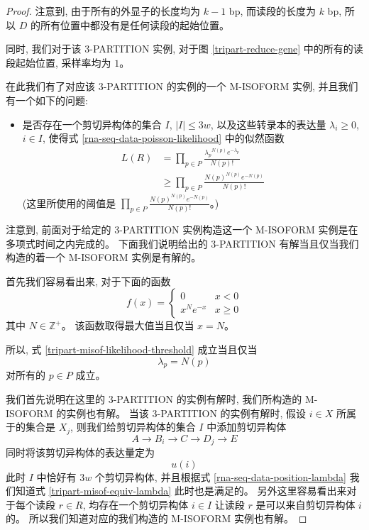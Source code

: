 \begin{proof}
注意到, 由于所有的外显子的长度均为 $k-1$ bp, 而读段的长度为 $k$ bp, 
所以 $D$ 的所有位置中都没有是任何读段的起始位置。 

同时, 我们对于该 3-PARTITION 实例, 
对于图 \ref{tripart-reduce-gene} 中的所有的读段起始位置, 采样率均为 $1$。 

在此我们有了对应该 3-PARTITION 的实例的一个 M-ISOFORM 实例, 并且我们有一个如下的问题: 
\begin{itemize}
\item 是否存在一个剪切异构体的集合 $I$, $|I| \leq 3w$, 
以及这些转录本的表达量 $\lambda_i \geq 0$, $i \in I$, 
使得式 \eqref{rna-seq-data-poisson-likelihood} 中的似然函数
\begin{align}
\label{tripart-misof-likelihood-threshold}
L(R) &= \prod_{p\in P} \frac{{\lambda_p}^{N(p)} e^{-\lambda_p}}{N(p)!} \nonumber \\
&\geq \prod_{p\in P} \frac{{N(p)}^{N(p)} e^{-N(p)}}{N(p)!}
\end{align}
(这里所使用的阈值是 $\prod_{p\in P} \frac{{N(p)}^{N(p)} e^{-N(p)}}{N(p)!}$。)
\end{itemize}

注意到, 前面对于给定的 3-PARTITION 实例构造这一个 M-ISOFORM 实例是在多项式时间之内完成的。 
下面我们说明给出的 3-PARTITION 有解当且仅当我们构造的着一个 M-ISOFORM 实例是有解的。 

首先我们容易看出来, 
对于下面的函数
\[
f(x) = \begin{cases}
0 & x < 0 \\
x^N e^{-x} & x \geq 0
\end{cases}
\]
其中 $N \in \mathbb{Z}^+$。 
该函数取得最大值当且仅当 $x=N$。 

所以, 式 \eqref{tripart-misof-likelihood-threshold} 成立当且仅当
\begin{equation}
\label{tripart-misof-equiv-lambda}
\lambda_p=N(p)
\end{equation}
对所有的 $p\in P$ 成立。  

我们首先说明在这里的 3-PARTITION 的实例有解时, 
我们所构造的 M-ISOFORM 的实例也有解。 
当该 3-PARTITION 的实例有解时, 假设 $i\in X$ 所属于的集合是 $X_j$, 
则我们给剪切异构体的集合 $I$ 中添加剪切异构体 
\[
A\to B_i \to C \to D_j \to E
\] 
同时将该剪切异构体的表达量定为 
\[
u(i)
\] 
此时 $I$ 中恰好有 $3w$ 个剪切异构体, 
并且根据式 \eqref{rna-seq-data-position-lambda} 我们知道式 
\eqref{tripart-misof-equiv-lambda} 此时也是满足的。 
另外这里容易看出来对于每个读段 $r\in R$, 
均存在一个剪切异构体 $i\in I$ 让读段 $r$ 是可以来自剪切异构体 $i$ 的。
所以我们知道对应的我们构造的 M-ISOFORM 实例也有解。 


\end{proof}
